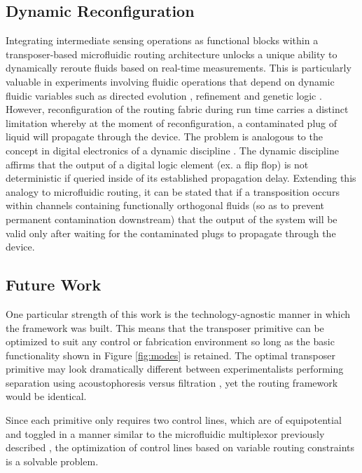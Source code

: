 \subsection{Dynamic Reconfiguration}
Integrating intermediate sensing operations as functional blocks within a transposer-based microfluidic routing architecture unlocks a unique ability to dynamically reroute fluids based on real-time measurements. This is particularly valuable in experiments involving fluidic operations that depend on dynamic fluidic variables such as directed evolution \cite{wang2014microfluidic}, refinement \cite{swain2013thinking} and genetic logic \cite{tamsir2011}. However, reconfiguration of the routing fabric during run time carries a distinct limitation whereby at the moment of reconfiguration, a contaminated plug of liquid will propagate through the device. The problem is analogous to the concept in digital electronics of a dynamic discipline \cite{Harris+Harris}. The dynamic discipline affirms that the output of a digital logic element (ex. a flip flop) is not deterministic if queried inside of its established propagation delay. Extending this analogy to microfluidic routing, it can be stated that if a transposition occurs within channels containing functionally orthogonal fluids (so as to prevent permanent contamination downstream) that the output of the system will be valid only after waiting for the contaminated plugs to propagate through the device.



\subsection{Future Work}
One particular strength of this work is the technology-agnostic manner in which the framework was built. This means that the transposer primitive can be optimized to suit any control or fabrication environment so long as the basic functionality shown in Figure \ref{fig:modes} is retained. The optimal transposer primitive may look dramatically different between experimentalists performing separation using acoustophoresis \cite{petersson2007free} versus filtration \cite{pamme2007continuous}, yet the routing framework would be identical.

Since each primitive only requires two control lines, which are of equipotential and toggled in a manner similar to the microfluidic multiplexor previously described \cite{thorsen2002}, the optimization of control lines based on variable routing constraints is a solvable problem.

